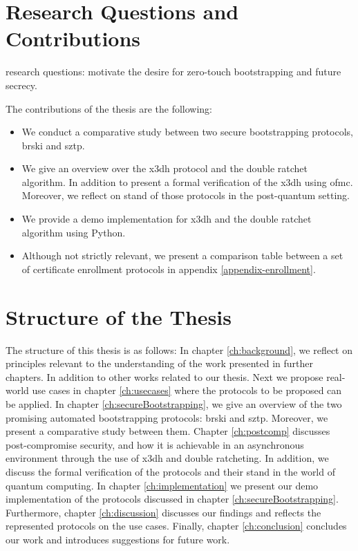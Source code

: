 \section{Research Questions and Contributions}\label{sec:reserach_questions}
research questions: motivate the desire for zero-touch bootstrapping and future secrecy.
\par
The contributions of the thesis are the following:
\begin{itemize}
	\item We conduct a comparative study between two secure bootstrapping protocols, \gls{brski} and \gls{sztp}.
	\item We give an overview over the \gls{x3dh} protocol and the double ratchet algorithm. In addition to present a formal verification of the \gls{x3dh} using \gls{ofmc}. Moreover, we reflect on stand of those protocols in the post-quantum setting.
	\item We provide a demo implementation for \gls{x3dh} and the double ratchet algorithm using Python.
	\item Although not strictly relevant, we present a comparison table between a set of certificate enrollment protocols in appendix \ref{appendix-enrollment}.
\end{itemize}

\section{Structure of the Thesis}\label{sec:structure_of_the_thesis}

The structure of this thesis is as follows: In chapter \ref{ch:background}, we reflect on principles relevant to the understanding of the work presented in further chapters. In addition to other works related to our thesis. 
Next we propose real-world use cases in chapter \ref{ch:usecases} where the protocols to be proposed can be applied.
In chapter \ref{ch:secureBootstrapping}, we give an overview of the two promising automated bootstrapping protocols: \gls{brski} and \gls{sztp}. Moreover, we present a comparative study between them.
Chapter \ref{ch:postcomp} discusses post-compromise security, and how it is achievable in an asynchronous environment through the use of \gls{x3dh} and double ratcheting. In addition, we discuss the formal verification of the protocols and their stand in the world of quantum computing.
In chapter \ref{ch:implementation} we present our demo implementation of the protocols discussed in chapter \ref{ch:secureBootstrapping}. 
Furthermore, chapter \ref{ch:discussion} discusses our findings and reflects the represented protocols on the use cases.
Finally, chapter \ref{ch:conclusion} concludes our work and introduces suggestions for future work.